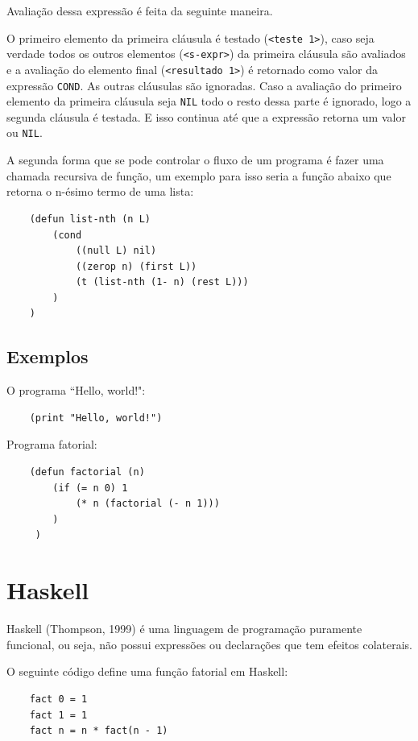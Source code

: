 \documentclass[a4paper, twoside, 12pt]{article}
\begin{document}
Avaliação dessa expressão é feita da seguinte maneira.

O primeiro elemento da primeira cláusula é testado (\texttt{<teste 1>}), caso seja verdade todos os outros elementos (\texttt{<s-expr>}) da primeira cláusula são avaliados e a avaliação do elemento final (\texttt{<resultado 1>}) é retornado como valor da expressão \texttt{COND}. As outras cláusulas são ignoradas. Caso a avaliação do primeiro elemento da primeira cláusula seja \texttt{NIL} todo o resto dessa parte é ignorado, logo a segunda cláusula é testada. E isso continua até que a expressão retorna um valor ou \texttt{NIL}.

A segunda forma que se pode controlar o fluxo de um programa é fazer uma chamada recursiva de função, um exemplo para isso seria a função abaixo que retorna o n-ésimo termo de uma lista:

\begin{verbatim}
    (defun list-nth (n L)
        (cond
            ((null L) nil)
            ((zerop n) (first L))
            (t (list-nth (1- n) (rest L)))
        )
    )
\end{verbatim}

\subsection{Exemplos}

O programa ``Hello, world!":

\begin{verbatim}
    (print "Hello, world!")
\end{verbatim}

Programa fatorial:

\begin{verbatim}
    (defun factorial (n)
        (if (= n 0) 1
            (* n (factorial (- n 1)))
        )
     )
\end{verbatim}

\section{Haskell \label{sec:haskell}}

Haskell (Thompson, 1999) é uma linguagem de programação puramente funcional, ou seja, não possui expressões ou declarações que tem efeitos colaterais.

O seguinte código define uma função fatorial em Haskell:

\begin{verbatim}
    fact 0 = 1
    fact 1 = 1
    fact n = n * fact(n - 1)
\end{verbatim}
\end{document}
